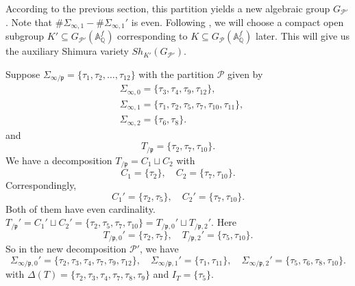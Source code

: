 \documentclass{article}
\begin{document}
According to the previous section, this partition yields a new algebraic group $G_{\mathcal{P}'}$. Note that $\#\Sigma_{\infty,1}-\#\Sigma_{\infty,1}'$ is even. Following \citep{Helm}, we will choose a compact open subgroup $K'\subseteq G_{\mathcal{P}'}(\mathbb{A}^f_\mathbb{Q})$ corresponding to $K\subseteq G_{\mathcal{P}}(\mathbb{A}^f_{\mathbb{Q}})$ later. This will give us the auxiliary Shimura variety $Sh_{K'}(G_{\mathcal{P}'})$.

\begin{example}
Suppose $\Sigma_{\infty/\mathfrak{p}}=\{\tau_1,\tau_2,\dots,\tau_{12}\}$ with the partition $\mathcal{P}$ given by
\begin{equation}
\begin{aligned}
&\Sigma_{\infty,0}=\{\tau_3,\tau_4,\tau_9,\tau_{12}\},\\
&\Sigma_{\infty,1}=\{\tau_1,\tau_2,\tau_5,\tau_7,\tau_{10},\tau_{11}\},\\
&\Sigma_{\infty,2}=\{\tau_6,\tau_8\}.
\end{aligned}
\end{equation}
and 
\begin{equation}
T_{/\mathfrak{p}}=\{\tau_2,\tau_7,\tau_{10}\}.
\end{equation}
We have a decomposition $T_{/\mathfrak{p}}=C_1\sqcup C_2$ with
\begin{equation}
C_1=\{\tau_2\},\quad C_2=\{\tau_7,\tau_{10}\}.
\end{equation}
Correspondingly,
\begin{equation}
C_1'=\{\tau_2,\tau_5\},\quad C_2'=\{\tau_7,\tau_{10}\}.
\end{equation}
Both of them have even cardinality. $T_{/\mathfrak{p}}'=C_1'\sqcup C_2'=\{\tau_2,\tau_5,\tau_7,\tau_{10}\}=T_{/\mathfrak{p},0}'\sqcup T_{/\mathfrak{p},2}'$. Here
\begin{equation}
T_{/\mathfrak{p},0}'=\{\tau_2,\tau_7\},\quad T_{/\mathfrak{p},2}'=\{\tau_5,\tau_{10}\}.
\end{equation}
So in the new decomposition $\mathcal{P}'$, we have
\begin{equation}
\Sigma_{\infty/\mathfrak{p},0}'=\{\tau_2,\tau_3,\tau_4,\tau_7,\tau_9,\tau_{12}\},\quad \Sigma_{\infty/\mathfrak{p},1}'=\{\tau_1,\tau_{11}\},\quad \Sigma_{\infty/\mathfrak{p},2}'=\{\tau_5,\tau_6,\tau_8,\tau_{10}\}.
\end{equation}
with $\Delta(T)=\{\tau_2,\tau_3,\tau_4,\tau_7,\tau_8,\tau_9\}$ and $I_T=\{\tau_5\}$.
\end{example}
\end{document}
